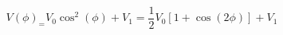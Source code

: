 \begin{equation}
\label{eq:Photodiode_Voltage}
V(\phi)_ = V_{0} \cos^2(\phi)+ V_{1} = \frac{1}{2}V_0\left[1 + \cos(2 \phi)\right]+ V_1
\end{equation}